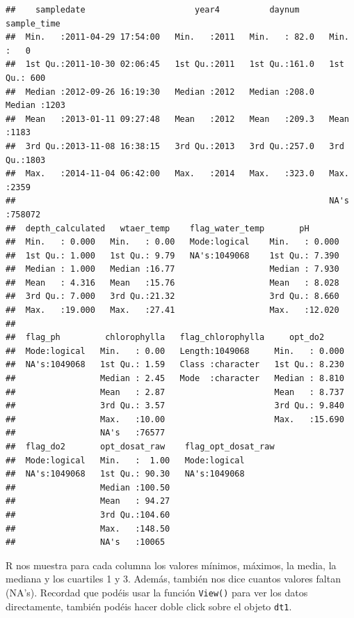 \documentclass[
]{book}
\newcommand{\passthrough}[1]{#1}
\begin{document}
\begin{lstlisting}
##    sampledate                      year4          daynum       sample_time    
##  Min.   :2011-04-29 17:54:00   Min.   :2011   Min.   : 82.0   Min.   :   0    
##  1st Qu.:2011-10-30 02:06:45   1st Qu.:2011   1st Qu.:161.0   1st Qu.: 600    
##  Median :2012-09-26 16:19:30   Median :2012   Median :208.0   Median :1203    
##  Mean   :2013-01-11 09:27:48   Mean   :2012   Mean   :209.3   Mean   :1183    
##  3rd Qu.:2013-11-08 16:38:15   3rd Qu.:2013   3rd Qu.:257.0   3rd Qu.:1803    
##  Max.   :2014-11-04 06:42:00   Max.   :2014   Max.   :323.0   Max.   :2359    
##                                                               NA's   :758072  
##  depth_calculated   wtaer_temp    flag_water_temp       pH        
##  Min.   : 0.000   Min.   : 0.00   Mode:logical    Min.   : 0.000  
##  1st Qu.: 1.000   1st Qu.: 9.79   NA's:1049068    1st Qu.: 7.390  
##  Median : 1.000   Median :16.77                   Median : 7.930  
##  Mean   : 4.316   Mean   :15.76                   Mean   : 8.028  
##  3rd Qu.: 7.000   3rd Qu.:21.32                   3rd Qu.: 8.660  
##  Max.   :19.000   Max.   :27.41                   Max.   :12.020  
##                                                                   
##  flag_ph         chlorophylla   flag_chlorophylla     opt_do2      
##  Mode:logical   Min.   : 0.00   Length:1049068     Min.   : 0.000  
##  NA's:1049068   1st Qu.: 1.59   Class :character   1st Qu.: 8.230  
##                 Median : 2.45   Mode  :character   Median : 8.810  
##                 Mean   : 2.87                      Mean   : 8.737  
##                 3rd Qu.: 3.57                      3rd Qu.: 9.840  
##                 Max.   :10.00                      Max.   :15.690  
##                 NA's   :76577                                      
##  flag_do2       opt_dosat_raw    flag_opt_dosat_raw
##  Mode:logical   Min.   :  1.00   Mode:logical      
##  NA's:1049068   1st Qu.: 90.30   NA's:1049068      
##                 Median :100.50                     
##                 Mean   : 94.27                     
##                 3rd Qu.:104.60                     
##                 Max.   :148.50                     
##                 NA's   :10065
\end{lstlisting}

R nos muestra para cada columna los valores mínimos, máximos, la media, la mediana y los cuartiles 1 y 3. Además, también nos dice cuantos valores faltan (NA's). Recordad que podéis usar la función \passthrough{\lstinline!View()!} para ver los datos directamente, también podéis hacer doble click sobre el objeto \passthrough{\lstinline!dt1!}.
\end{document}
